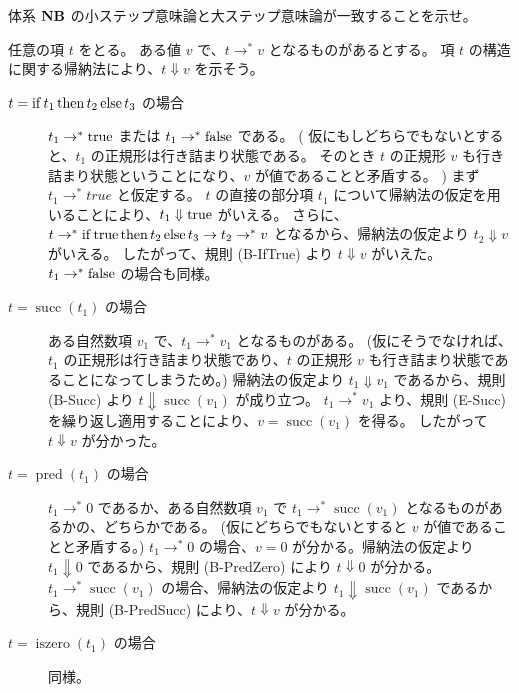 \begin{jexercise*}[3.5.17]
  体系 ${\bf NB}$ の小ステップ意味論と大ステップ意味論が一致することを示せ。
\end{jexercise*}
\begin{jproof}
  任意の項 $t$ をとる。
  ある値 $v$ で、$t \to^* v$ となるものがあるとする。
  項 $t$ の構造に関する帰納法により、$t \Downarrow v$ を示そう。
  \begin{description}
    \item[$t = \operatorname{if} t_1 \operatorname{then} t_2 \operatorname{else} t_3$ の場合]
      $t_1 \to^* \operatorname{true}$ または $t_1 \to^* \operatorname{false}$ である。
      (
        仮にもしどちらでもないとすると、$t_1$ の正規形は行き詰まり状態である。
        そのとき $t$ の正規形 $v$ も行き詰まり状態ということになり、$v$ が値であることと矛盾する。
      )
      まず $t_1 \to^* true$ と仮定する。
      $t$ の直接の部分項 $t_1$ について帰納法の仮定を用いることにより、$t_1 \Downarrow \operatorname{true}$ がいえる。
      さらに、$t \to^* \operatorname{if} \operatorname{true} \operatorname{then} t_2 \operatorname{else} t_3 \to t_2 \to^* v$ となるから、帰納法の仮定より $t_2 \Downarrow v$ がいえる。
      したがって、規則 (B-IfTrue) より $t \Downarrow v$ がいえた。
      $t_1 \to^* \operatorname{false}$ の場合も同様。
    \item[$t = \operatorname{succ}(t_1)$ の場合]
      ある自然数項 $v_1$ で、$t_1 \to^* v_1$ となるものがある。
      (仮にそうでなければ、$t_1$ の正規形は行き詰まり状態であり、$t$ の正規形 $v$ も行き詰まり状態であることになってしまうため。)
      帰納法の仮定より $t_1 \Downarrow v_1$ であるから、規則 (B-Succ) より $t \Downarrow \operatorname{succ}(v_1)$ が成り立つ。
      $t_1 \to^* v_1$ より、規則 (E-Succ) を繰り返し適用することにより、$v = \operatorname{succ}(v_1)$ を得る。
      したがって $t \Downarrow v$ が分かった。
    \item[$t = \operatorname{pred}(t_1)$ の場合]
      $t_1 \to^* 0$ であるか、ある自然数項 $v_1$ で $t_1 \to^* \operatorname{succ}(v_1)$ となるものがあるかの、どちらかである。
      (仮にどちらでもないとすると $v$ が値であることと矛盾する。)
      $t_1 \to^* 0$ の場合、$v = 0$ が分かる。帰納法の仮定より $t_1 \Downarrow 0$ であるから、規則 (B-PredZero) により $t \Downarrow 0$ が分かる。
      $t_1 \to^* \operatorname{succ}(v_1)$ の場合、帰納法の仮定より $t_1 \Downarrow \operatorname{succ}(v_1)$ であるから、規則 (B-PredSucc) により、$t \Downarrow v$ が分かる。
    \item[$t = \operatorname{iszero}(t_1)$ の場合]
      同様。
  \end{description}


\end{jproof}
